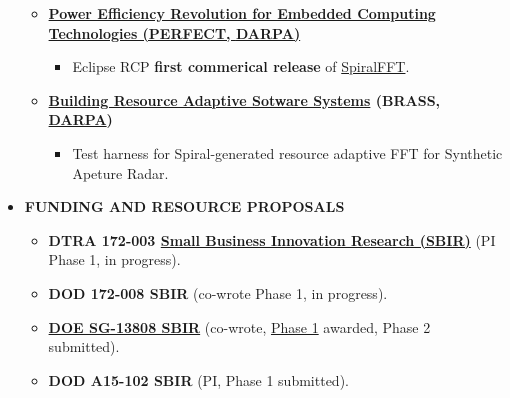 \documentclass{article}
\begin{document}
\begin{itemize}
\begin{itemize}
\begin{itemize}
      \end{itemize}

    \item \textbf{\href{http://www.darpa.mil/Our_Work/MTO/Programs/Power_Efficiency_Revolution_for_Embedded_Computing_Technologies_(PERFECT).aspx}{Power Efficiency Revolution for Embedded Computing Technologies (PERFECT, \href{http://www.darpa.mil/default.aspx}{DARPA})}}

      \begin{itemize}
        \item Eclipse RCP \textbf{first commerical release} of \href{http://www.spiralgen.com/new-products/spiral-fft-gpl-10}{SpiralFFT}.  
      \end{itemize}

    \item \textbf{\href{http://www.darpa.mil/program/building-resource-adaptive-software-systems}{Building Resource Adaptive Sotware Systems} (BRASS, \href{http://www.darpa.mil/default.aspx}{DARPA})}

      \begin{itemize}
        \item Test harness for Spiral-generated resource adaptive FFT for Synthetic Apeture Radar. 
      \end{itemize}

  \end{itemize}

\item \textbf{FUNDING AND RESOURCE PROPOSALS}
        \begin{itemize}
          \item \textbf{DTRA 172-003 \href{http://science.energy.gov/sbir/}{Small Business Innovation Research (SBIR)}} (PI Phase 1, in progress).

          \item \textbf{DOD 172-008 SBIR} (co-wrote Phase 1, in progress).

          \item \textbf{\href{http://science.energy.gov/sbir/}{DOE SG-13808 SBIR}} (co-wrote, \href{https://www.osti.gov/scitech/servlets/purl/1242462}{Phase 1} awarded, Phase 2 submitted).

          \item \textbf{DOD A15-102 SBIR} (PI, Phase 1 submitted).


\end{itemize}
\end{itemize}
\end{document}
